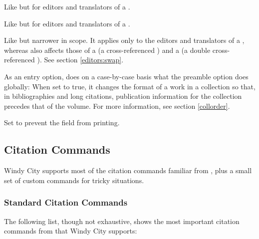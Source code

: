 \documentclass[11pt,letterpaper,oneside]{article}
\begin{document}
\begin{optionlist}

Like  but for editors and translators of a
.


Like  but for editors and translators of a
.


Like  but narrower in scope. It applies only to the
editors and translators of a , whereas
 also affects those of a  (a
cross-referenced ) and a  (a
double cross-referenced ). See section
\ref{editors:swap}.


\noindent As an entry option,  does on a case-by-case
basis what the  preamble option does globally: When set
to true, it changes the format of a work in a collection so that, in
bibliographies and long citations, publication information for the
collection precedes that of the volume. For more information, see
section \ref{collorder}.


\noindent Set  to prevent the  field from
printing.

\end{optionlist}

\subsection{Citation Commands}

Windy City supports most of the citation commands familiar from
\biblatex, plus a small set of custom commands for tricky situations.

\subsubsection{Standard Citation Commands}
\label{std.cmd}

The following list, though not exhaustive, shows the most important
citation commands from \biblatex that Windy City supports:
\end{document}
